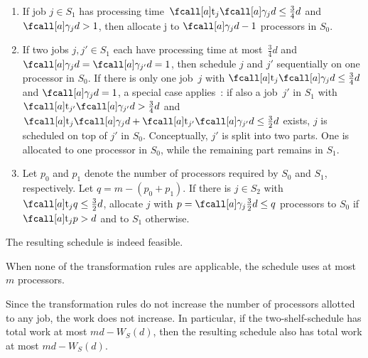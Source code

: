 \begin{enumerate}
  \item If job $j \in S_1$ has processing time~$\ptm{j}{\procnum{j}{d}} \leq \frac{3}{4} d$
    and $\procnum{j}{d} > 1$, then allocate j to $\procnum{j}{d} - 1$ processors in $S_0$. \label{item:rule-1}
  \item If two jobs $j, j' \in S_1$ each have processing time at most~$\frac{3}{4} d$
    and $\procnum{j}{d} = \procnum{j'}{d} = 1$, then schedule $j$ and $j'$
    sequentially on one processor in $S_0$.
    If there is only one job~$j$ with $\ptm{j}{\procnum{j}{d}} \leq \frac{3}{4} d$ and $\procnum{j}{d} = 1$,
    a special case applies~\cite{mounie04}: if also a job~$j'$ in $S_1$ with $\ptm{j'}{\procnum{j'}{d}} > \frac{3}{4} d$
    and $\ptm{j}{\procnum{j}{d}} + \ptm{j'}{\procnum{j'}{d}} \leq \frac{3}{2} d$ exists,
    $j$ is scheduled on top of $j'$ in $S_0$.
    Conceptually, $j'$ is split into two parts. One is allocated to one processor in $S_0$,
    while the remaining part remains in $S_1$. \label{item:rule-2}
  \item Let $p_0$ and $p_1$ denote the number of processors required by $S_0$ and $S_1$, respectively.
    Let $q = m - (p_0 + p_1)$.
    If there is $j \in S_2$ with $\ptm{j}{q} \leq \frac{3}{2} d$,
    allocate $j$ with $p = \procnum{j}{\frac{3}{2} d} \leq q$ processors
    to $S_0$ if $\ptm{j}{p} > d$ and to $S_1$ otherwise. \label{item:rule-3}
\end{enumerate}

The resulting schedule is indeed feasible.
\begin{lemma}
  \label{lemma:transform}
  When none of the transformation rules are applicable, the schedule uses at most~$m$ processors.
\end{lemma}

Since the transformation rules do not increase the number of processors allotted to any job,
the work does not increase.
In particular, if the two-shelf-schedule has total work at most $md - W_S(d)$,
then the resulting schedule also has total work at most $md - W_S(d)$.

